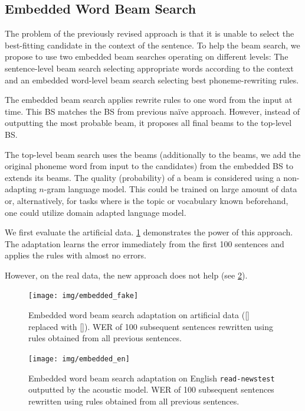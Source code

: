 \subsection{Embedded Word Beam Search}
The problem of the previously revised approach is that it is unable to select the best-fitting candidate in the context of the sentence. To help the beam search, we propose to use two embedded beam searches operating on different levels: The sentence-level beam search selecting appropriate words according to the context and an embedded word-level beam search selecting best phoneme-rewriting rules.

The embedded beam search applies rewrite rules to one word from the input at time. This BS matches the BS from previous na\"ive approach. However, instead of outputting the most probable beam, it proposes all final beams to the top-level BS.

The top-level beam search uses the beams (additionally to the beams, we add the original phoneme word from input to the candidates) from the embedded BS to extends its beams. The quality (probability) of a beam is considered using a non-adapting $n$-gram language model. This could be trained on large amount of data or, alternatively, for tasks where is the topic or vocabulary known beforehand, one could utilize domain adapted language model. 

We first evaluate the artificial data. \cref{fig:embedded} demonstrates the power of this approach. The adaptation learns the error immediately from the first 100 sentences and applies the rules with almost no errors.

However, on the real data, the new approach does not help (see \cref{fig:embedded_en}). 

\begin{figure}[h]
	\texttt{[image: img/embedded\_fake]}
	\caption{Embedded word beam search  adaptation on artificial data ([] replaced with []). WER of 100 subsequent sentences rewritten using rules obtained from all previous sentences.}
	\label{fig:embedded} 
\end{figure}

\begin{figure}[h]
	\texttt{[image: img/embedded\_en]}
	\caption{Embedded word beam search adaptation on English \texttt{read-newstest} outputted by the acoustic model. WER of 100 subsequent sentences rewritten using rules obtained from all previous sentences.}
	\label{fig:embedded_en} 
\end{figure}


